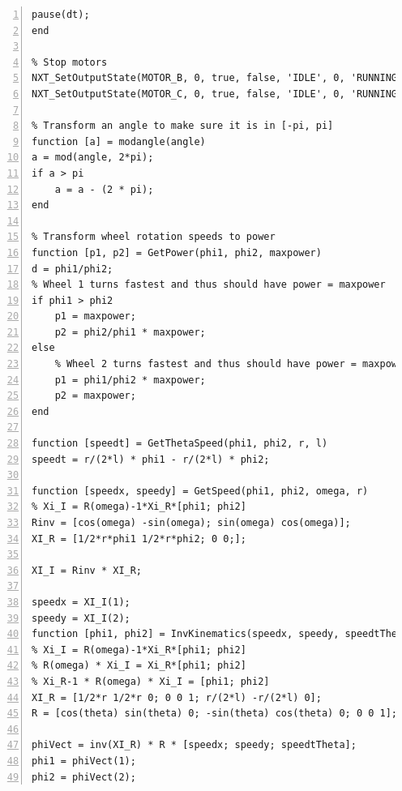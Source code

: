 \documentclass[a4paper]{article}
\begin{document}
\begin{lstlisting}[caption= Kinematica met feedback code, label=lst:bocht, numbers=left]
	pause(dt);
end

% Stop motors
NXT_SetOutputState(MOTOR_B, 0, true, false, 'IDLE', 0, 'RUNNING',  0, 'dontreply');
NXT_SetOutputState(MOTOR_C, 0, true, false, 'IDLE', 0, 'RUNNING',  0, 'dontreply');

% Transform an angle to make sure it is in [-pi, pi]
function [a] = modangle(angle)
a = mod(angle, 2*pi);
if a > pi
    a = a - (2 * pi);
end

% Transform wheel rotation speeds to power
function [p1, p2] = GetPower(phi1, phi2, maxpower)
d = phi1/phi2;
% Wheel 1 turns fastest and thus should have power = maxpower
if phi1 > phi2
	p1 = maxpower;
	p2 = phi2/phi1 * maxpower;
else
    % Wheel 2 turns fastest and thus should have power = maxpower
	p1 = phi1/phi2 * maxpower;
	p2 = maxpower;
end

function [speedt] = GetThetaSpeed(phi1, phi2, r, l)
speedt = r/(2*l) * phi1 - r/(2*l) * phi2;

function [speedx, speedy] = GetSpeed(phi1, phi2, omega, r)
% Xi_I = R(omega)-1*Xi_R*[phi1; phi2]
Rinv = [cos(omega) -sin(omega); sin(omega) cos(omega)];
XI_R = [1/2*r*phi1 1/2*r*phi2; 0 0;];

XI_I = Rinv * XI_R;

speedx = XI_I(1);
speedy = XI_I(2);
function [phi1, phi2] = InvKinematics(speedx, speedy, speedtTheta, theta, r, l)
% Xi_I = R(omega)-1*Xi_R*[phi1; phi2]
% R(omega) * Xi_I = Xi_R*[phi1; phi2]
% Xi_R-1 * R(omega) * Xi_I = [phi1; phi2]
XI_R = [1/2*r 1/2*r 0; 0 0 1; r/(2*l) -r/(2*l) 0];
R = [cos(theta) sin(theta) 0; -sin(theta) cos(theta) 0; 0 0 1];

phiVect = inv(XI_R) * R * [speedx; speedy; speedtTheta];
phi1 = phiVect(1);
phi2 = phiVect(2);

\end{lstlisting}
\end{document}
